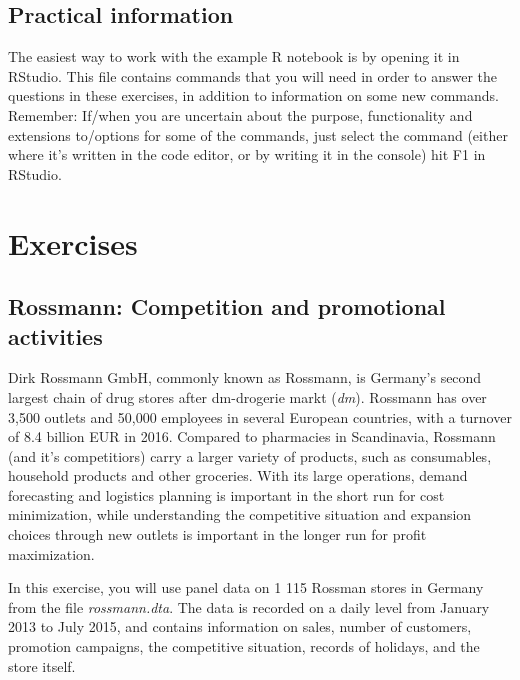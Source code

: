 \documentclass[12pt,a4paper]{article}
\begin{document}
\subsection*{Practical information}
The easiest way to work with the example R notebook is by opening it in RStudio. This file contains commands that you will need in order to answer the questions in these exercises, in addition to information on some new commands. Remember: If/when you are uncertain about the purpose, functionality and extensions to/options for some of the commands, just select the command (either where it's written in the code editor, or by writing it in the console) hit F1 in RStudio.


\section*{Exercises}

\subsection*{Rossmann: Competition and promotional activities}
Dirk Rossmann GmbH, commonly known as Rossmann, is Germany's second largest chain of drug stores after dm-drogerie markt (\emph{dm}). Rossmann has over 3,500 outlets and 50,000 employees in several European countries, with a turnover of 8.4 billion EUR in 2016. Compared to pharmacies in Scandinavia, Rossmann (and it's competitiors) carry a larger variety of products, such as consumables, household products and other groceries. With its large operations, demand forecasting and logistics planning is important in the short run for cost minimization, while understanding the competitive situation and expansion choices through new outlets is important in the longer run for profit maximization.

In this exercise, you will use panel data on 1 115 Rossman stores in Germany from the file \emph{rossmann.dta}. The data is recorded on a daily level from January 2013 to July 2015, and contains information on sales, number of customers, promotion campaigns, the competitive situation, records of holidays, and the store itself.
\end{document}
